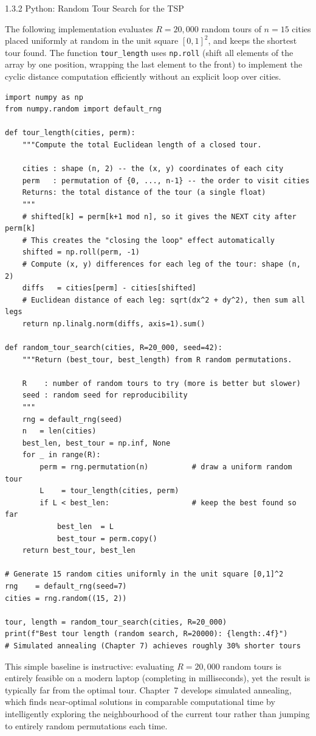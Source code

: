 \documentclass[aspectratio=169,10pt]{beamer}
\begin{document}
\begin{frame}[fragile]{1.3.2 Python: Random Tour Search for the TSP}

  The following implementation evaluates $R = 20{,}000$ random tours of
  $n = 15$ cities placed uniformly at random in the unit square $[0,1]^2$,
  and keeps the shortest tour found.  The function \texttt{tour\_length}
  uses \texttt{np.roll} (shift all elements of the array by one position,
  wrapping the last element to the front) to implement the cyclic distance
  computation efficiently without an explicit loop over cities.

\begin{lstlisting}[style=python]
import numpy as np
from numpy.random import default_rng

def tour_length(cities, perm):
    """Compute the total Euclidean length of a closed tour.

    cities : shape (n, 2) -- the (x, y) coordinates of each city
    perm   : permutation of {0, ..., n-1} -- the order to visit cities
    Returns: the total distance of the tour (a single float)
    """
    # shifted[k] = perm[k+1 mod n], so it gives the NEXT city after perm[k]
    # This creates the "closing the loop" effect automatically
    shifted = np.roll(perm, -1)
    # Compute (x, y) differences for each leg of the tour: shape (n, 2)
    diffs   = cities[perm] - cities[shifted]
    # Euclidean distance of each leg: sqrt(dx^2 + dy^2), then sum all legs
    return np.linalg.norm(diffs, axis=1).sum()

def random_tour_search(cities, R=20_000, seed=42):
    """Return (best_tour, best_length) from R random permutations.

    R    : number of random tours to try (more is better but slower)
    seed : random seed for reproducibility
    """
    rng = default_rng(seed)
    n   = len(cities)
    best_len, best_tour = np.inf, None
    for _ in range(R):
        perm = rng.permutation(n)          # draw a uniform random tour
        L    = tour_length(cities, perm)
        if L < best_len:                   # keep the best found so far
            best_len  = L
            best_tour = perm.copy()
    return best_tour, best_len

# Generate 15 random cities uniformly in the unit square [0,1]^2
rng    = default_rng(seed=7)
cities = rng.random((15, 2))

tour, length = random_tour_search(cities, R=20_000)
print(f"Best tour length (random search, R=20000): {length:.4f}")
# Simulated annealing (Chapter 7) achieves roughly 30% shorter tours
\end{lstlisting}

  This simple baseline is instructive: evaluating $R = 20{,}000$ random tours
  is entirely feasible on a modern laptop (completing in milliseconds), yet the
  result is typically far from the optimal tour.  Chapter~7 develops simulated
  annealing, which finds near-optimal solutions in comparable computational time
  by intelligently exploring the neighbourhood of the current tour rather than
  jumping to entirely random permutations each time.

\end{frame}
\end{document}
